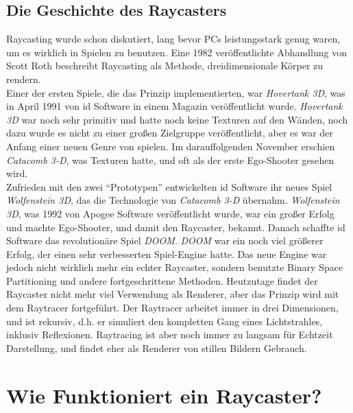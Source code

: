 \documentclass[a4paper,12pt]{report}
\begin{document}
\subsection{Die Geschichte des Raycasters}
Raycasting wurde schon diskutiert, lang bevor PCs leistungsstark genug waren, um es wirklich in Spielen zu benutzen. Eine 1982 veröffentlichte Abhandlung von Scott Roth beschreibt Raycasting als Methode, dreidimensionale Körper zu rendern. \\
Einer der ersten Spiele, die das Prinzip implementierten, war \textit{Hovertank 3D}, was in April 1991 von id Software in einem Magazin veröffentlicht wurde. \textit{Hovertank 3D} war noch sehr primitiv und hatte noch keine Texturen auf den Wänden, noch dazu wurde es nicht zu einer großen Zielgruppe veröffentlicht, aber es war der Anfang einer neuen Genre von spielen. Im darauffolgenden November erschien \textit{Catacomb 3-D}, was Texturen hatte, und oft als der erste Ego-Shooter gesehen wird. \\
Zufrieden mit den zwei ``Prototypen'' entwickelten id Software ihr neues Spiel \textit{Wolfenstein 3D}, das die Technologie von \textit{Catacomb 3-D} übernahm. \textit{Wolfenstein 3D}, was 1992 von Apogee Software veröffentlicht wurde, war ein großer Erfolg und machte Ego-Shooter, und damit den Raycaster, bekannt. Danach schaffte id Software das revolutionäre Spiel \textit{DOOM}. \textit{DOOM} war ein noch viel größerer Erfolg, der einen sehr verbesserten Spiel-Engine hatte. Das neue Engine war jedoch nicht wirklich mehr ein echter Raycaster, sondern benutzte Binary Space Partitioning und andere fortgeschrittene Methoden. Heutzutage findet der Raycaster nicht mehr viel Verwendung als Renderer, aber das Prinzip wird mit dem Raytracer fortgeführt. Der Raytracer arbeitet immer in drei Dimensionen, und ist rekursiv, d.h. er simuliert den kompletten Gang eines Lichtstrahles, inklusiv Reflexionen. Raytracing ist aber noch immer zu langsam für Echtzeit Darstellung, und findet eher als Renderer von stillen Bildern Gebrauch.

\section{Wie Funktioniert ein Raycaster?}
\end{document}
